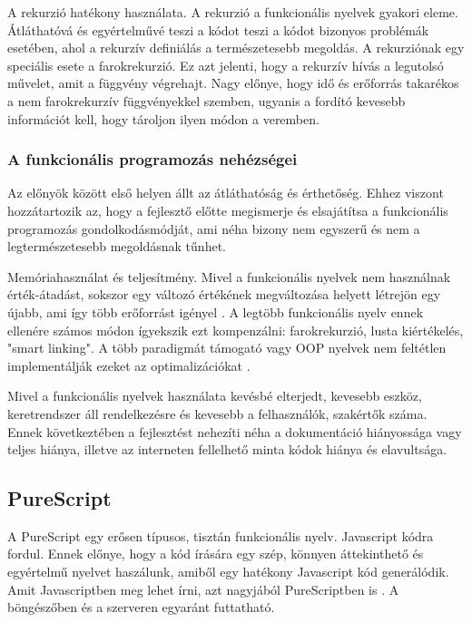 \documentclass[12pt]{article}
\begin{document}
A rekurzió hatékony használata. A rekurzió a funkcionális nyelvek gyakori eleme. Átláthatóvá és egyértelművé teszi a kódot teszi a kódot bizonyos problémák esetében, ahol a rekurzív definiálás a természetesebb megoldás. A rekurziónak egy speciális esete a farokrekurzió. Ez azt jelenti, hogy a rekurzív hívás a legutolsó művelet, amit a függvény végrehajt. Nagy előnye, hogy idő és erőforrás takarékos a nem farokrekurzív függvényekkel szemben, ugyanis a fordító kevesebb információt kell, hogy tároljon ilyen módon a veremben.

\subsubsection{A funkcionális programozás nehézségei}

Az előnyök között első helyen állt az átláthatóság és érthetőség. Ehhez viszont hozzátartozik az, hogy a fejlesztő előtte megismerje és elsajátítsa a funkcionális programozás gondolkodásmódját, ami néha bizony nem egyszerű és nem a legtermészetesebb megoldásnak tűnhet.

Memóriahasználat és teljesítmény. Mivel a funkcionális nyelvek nem használnak érték-átadást, sokszor egy változó értékének megváltozása helyett létrejön egy újabb, ami így több erőforrást igényel \cite{JN}. A legtöbb funkcionális nyelv ennek ellenére számos módon ígyekszik ezt kompenzálni: farokrekurzió, lusta kiértékelés, "smart linking". A több paradigmát támogató vagy OOP nyelvek nem feltétlen implementálják ezeket az optimalizációkat \cite{JN}.

Mivel a funkcionális nyelvek használata kevésbé elterjedt, kevesebb eszköz, keretrendszer áll rendelkezésre és kevesebb a felhasználók, szakértők száma. Ennek következtében a fejlesztést nehezíti néha a dokumentáció hiányossága vagy teljes hiánya, illetve az interneten fellelhető minta kódok hiánya és elavultsága.

\subsection{PureScript}

A PureScript egy erősen típusos, tisztán funkcionális nyelv. Javascript kódra fordul. Ennek előnye, hogy a kód írására egy szép, könnyen áttekinthető és egyértelmű nyelvet haszálunk, amiből egy hatékony Javascript kód generálódik. Amit Javascriptben meg lehet írni, azt nagyjából PureScriptben is \cite{CS}. A böngészőben és  a szerveren egyaránt futtatható.
\end{document}
